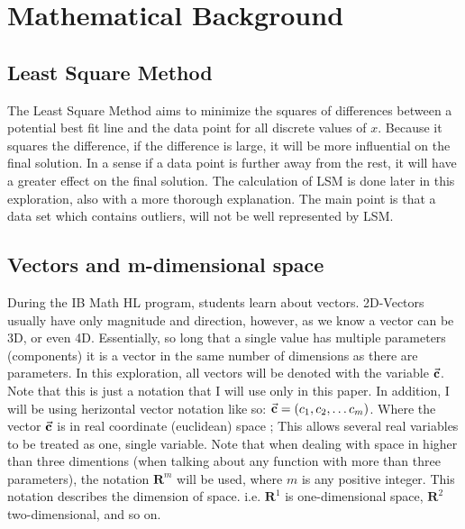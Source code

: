 \section{Mathematical Background} \label{concepts}
\subsection{Least Square Method}
The Least Square Method aims to minimize the squares of differences between a potential best fit line and the data point for all discrete values of $x$. Because it squares the difference, if the difference is large, it will be more influential on the final solution. In a sense if a data point is further away from the rest, it will have a greater effect on the final solution. The calculation of LSM is done later in this exploration, also with a more thorough explanation. The main point is that a data set which contains outliers, will not be well represented by LSM.
\subsection{Vectors and m-dimensional space}

During the IB Math HL program, students learn about vectors. 2D-Vectors usually have only magnitude and direction, however, as we know a vector can be 3D, or even 4D. Essentially, so long that a single value has multiple parameters (components) it is a vector in the same number of dimensions as there are parameters. In this exploration, all vectors will be denoted with the variable $\vec{\textbf{c}}$. Note that this is just a notation that I will use only in this paper. In addition, I will be using herizontal vector notation like so: $\vec{\textbf{c}}=(c_{1},c_{2},\dots c_{m})$. Where the vector ${\vec{\textbf{c}}}$ is in real coordinate (euclidean) space \cite{kelley_1995}; This allows several real variables to be treated as one, single variable. Note that when dealing with space in higher than three dimentions (when talking about any function with more than three parameters), the notation $\boldsymbol{R}^{m}$ will be used, where $m$ is any positive integer. This notation describes the dimension of space. i.e. $\boldsymbol{R}^{1}$ is one-dimensional space, $\boldsymbol{R}^{2}$ two-dimensional, and so on. \cite{Weisstein_2014}
